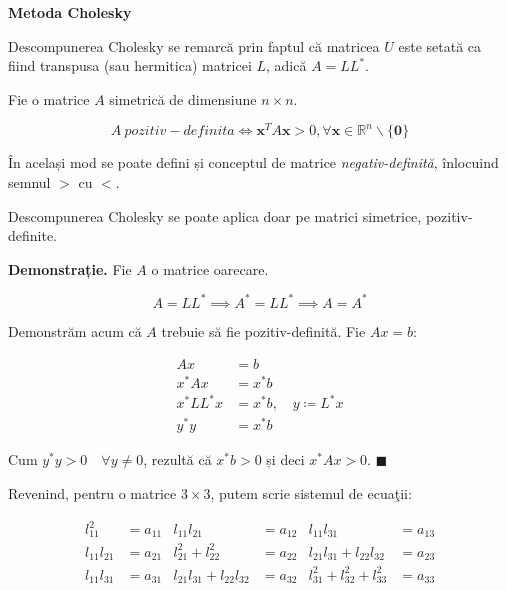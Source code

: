 \documentclass{exam}
\newcommand{\octavescript}[2]{

}
\begin{document}
\newpage
\octavescript{./src/doolittle.m}{}

\textbf{Metoda Cholesky}

\par Descompunerea Cholesky se remarcă prin faptul că matricea $U$ este setată
ca fiind transpusa (sau hermitica) matricei $L$, adică $A = LL^*$.

\par Fie o matrice $A$ simetrică de dimensiune $n \times n$.

\begin{equation*}
	A \ pozitiv-definita \Leftrightarrow \mathbf{x}^T A \mathbf{x} > 0, \forall \mathbf{x} \in \mathbb{R}^n \backslash \{\mathbf{0}\}
\end{equation*}

\par În același mod se poate defini și conceptul de matrice
\textit{negativ-definită}, înlocuind semnul $>$ cu $<$.

\par Descompunerea Cholesky se poate aplica doar pe matrici simetrice,
pozitiv-definite.

\textbf{Demonstrație.} Fie $A$ o matrice oarecare.

\begin{equation*}
	A = LL^* \implies A^* = LL^* \implies A = A^*
\end{equation*}

\par Demonstrăm acum că $A$ trebuie să fie pozitiv-definită. Fie $Ax = b$:

\begin{align*}
	Ax          & = b                             \\
	x^* A x     & = x^* b                         \\
	x^* L L^* x & = x^* b, \quad y \coloneq L^* x \\
	y^* y       & = x^* b
\end{align*}

\par Cum $y^* y > 0 \quad \forall y \neq 0$, rezultă că $x^* b > 0$ și deci
$x^* A x > 0$. $\blacksquare$

\newpage
\par Revenind, pentru o matrice $3 \times 3$, putem scrie sistemul de ecuaţii:

\begin{align*}
	l_{11}^2     & = a_{11} & l_{11}l_{21}                & = a_{12} & l_{11}l_{31}                   & = a_{13} \\
	l_{11}l_{21} & = a_{21} & l_{21}^2 + l_{22}^2         & = a_{22} & l_{21}l_{31} + l_{22}l_{32}    & = a_{23} \\
	l_{11}l_{31} & = a_{31} & l_{21}l_{31} + l_{22}l_{32} & = a_{32} & l_{31}^2 + l_{32}^2 + l_{33}^2 & = a_{33}
\end{align*}
\end{document}
